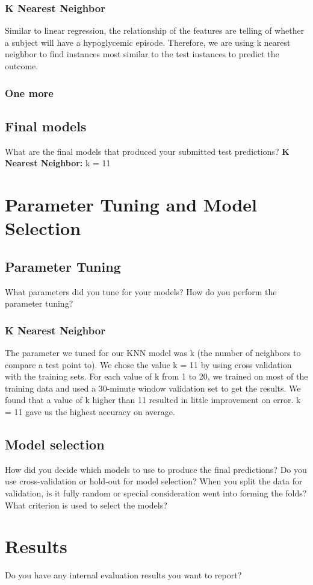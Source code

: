\documentclass[11pt,a4paper]{article}
\begin{document}
\subsubsection{K Nearest Neighbor}
Similar to linear regression, the relationship of the features are telling of whether a subject will have a hypoglycemic episode. Therefore, we are using k nearest neighbor to find instances most similar to the test instances to predict the outcome.
\subsubsection{One more}
\subsection{Final models}
What are the final models that produced your submitted test predictions?
\textbf{K Nearest Neighbor: }k = 11

\section{Parameter Tuning and Model Selection }
\subsection{Parameter Tuning}
What parameters did you tune for your models? How do you perform the parameter tuning?
\subsubsection{K Nearest Neighbor}
The parameter we tuned for our KNN model was k (the number of neighbors to compare a test point to). We chose the value k = 11 by using cross validation with the training sets. For each value of k from 1 to 20, we trained on most of the training data and used a 30-minute window validation set to get the results. We found that a value of k higher than 11 resulted in little improvement on error. k = 11 gave us the highest accuracy on average.

\subsection{Model selection}
How did you decide which models to use to produce the final predictions?  Do you use cross-validation or hold-out for model selection? When you split the data for validation, is it fully random or special consideration went into forming the folds? What criterion is used to select the models?

\section{Results}
Do you have any internal evaluation results you want to report?
\end{document}
